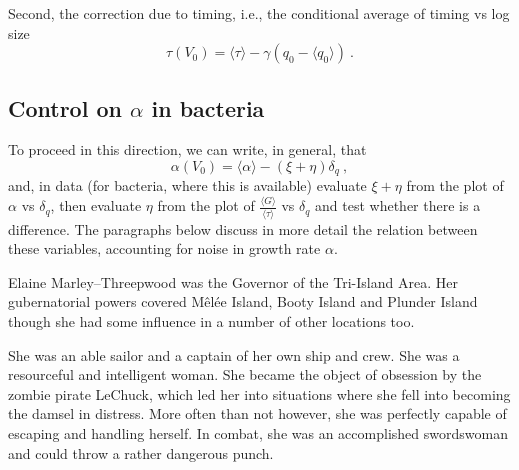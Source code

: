 \documentclass[a4paper,12pt,rmp,superscriptaddress]{revtex4}
\begin{document}


Second, the correction due to timing, i.e., the conditional average of
timing vs log size
\begin{displaymath}
  \tau(V_0) = \langle \tau \rangle - \gamma (q_0 - \langle q_0
  \rangle) \ .
\end{displaymath}




\subsection*{Control on $\alpha$ in bacteria}

To proceed in this direction,  we can write, in general, that 
\begin{displaymath}
  \alpha(V_0) = 
   \langle \alpha \rangle - (\xi + \eta) \delta_q \ ,
\end{displaymath}
and, in data (for bacteria, where this is available) evaluate $\xi +
\eta$ from the plot of $\alpha$ vs $\delta_q$, then evaluate $\eta$
from the plot of $ \frac{\langle G \rangle}{\langle \tau \rangle}$ vs
$\delta_q$ and test whether there is a difference. The paragraphs
below discuss in more detail the relation between these variables,
accounting for noise in growth rate $\alpha$.




Elaine Marley–Threepwood was the Governor of the Tri-Island Area. Her
gubernatorial powers covered Mêlée Island, Booty Island and Plunder
Island though she had some influence in a number of other locations
too.

She was an able sailor and a captain of her own ship and crew. She was
a resourceful and intelligent woman. She became the object of
obsession by the zombie pirate LeChuck, which led her into situations
where she fell into becoming the damsel in distress. More often than
not however, she was perfectly capable of escaping and handling
herself. In combat, she was an accomplished swordswoman and could
throw a rather dangerous punch.
\end{document}
